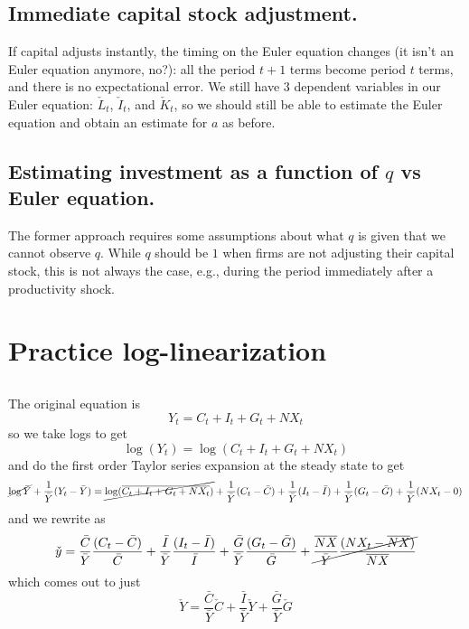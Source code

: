 \documentclass[11pt]{amsart}
\begin{document}
\subsection{Immediate capital stock adjustment.}
If capital adjusts instantly, the timing on the Euler equation changes (it isn't an Euler equation anymore, no?): all the period $t+1$ terms become period $t$ terms, and there is no expectational error. We still have 3 dependent variables in our Euler equation: $\check{L}_{t}$, $\check{I}_{t}$, and $\check{K}_{t}$, so we should still be able to estimate the Euler equation and obtain an estimate for $a$ as before.

\subsection{Estimating investment as a function of $q$ vs Euler equation.}
The former approach requires some assumptions about what $q$ is given that we cannot observe $q$. While $q$ should be $1$ when firms are not adjusting their capital stock, this is not always the case, e.g., during the period immediately after a productivity shock.

\section{Practice log-linearization}

\subsection{}
The original equation is
\[
Y_t = C_t + I_t + G_t + NX_t
\]
so we take logs to get
\[
\log(Y_t) = \log(C_t + I_t + G_t + NX_t)
\]
and do the first order Taylor series expansion at the steady state to get
\[
\cancel{\log \bar{Y}} + \frac{1}{\bar{Y}} (Y_t - \bar{Y}) = \cancel{\log(\overline{C_t + I_t + G_t + NX_t})} + \frac{1}{\bar{Y}} (C_t - \bar{C}) + \frac{1}{\bar{Y}} (I_t - \bar{I}) + \frac{1}{\bar{Y}} (G_t - \bar{G}) + \frac{1}{\bar{Y}} (NX_t - 0)
\]
and we rewrite as
\[
\check{y} = \frac{\bar{C}}{\bar{Y}} \frac{(C_t - \bar{C})}{\bar{C}} + \frac{\bar{I}}{\bar{Y}} \frac{(I_t - \bar{I})}{\bar{I}} + \frac{\bar{G}}{\bar{Y}} \frac{(G_t - \bar{G})}{\bar{G}} + \cancel{\frac{\overline{NX}}{\bar{Y}} \frac{(NX_t - \overline{NX})}{\overline{NX}}}
\]
which comes out to just
\[
\check{Y} = \frac{\bar{C}}{\bar{Y}} \check{C} + \frac{\bar{I}}{\bar{Y}} \check{Y} + \frac{\bar{G}}{\bar{Y}} \check{G}
\]
\end{document}
